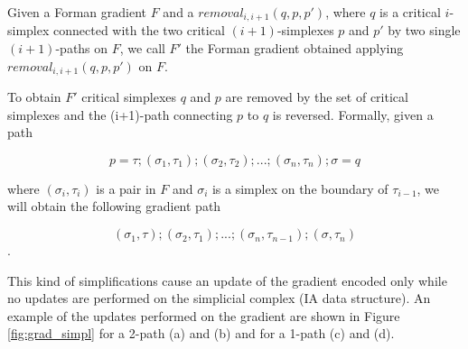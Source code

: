 \documentclass[preprint,5p,times,onecolumn]{article}
\begin{document}
Given a Forman gradient $F$ and a $removal_{i,i+1}(q,p,p')$, where $q$ is a critical $i$-simplex connected with the two critical $(i+1)$-simplexes $p$ and $p'$ by two single $(i+1)$-paths on $F$, we call $F'$ the Forman gradient obtained applying $removal_{i,i+1}(q,p,p')$ on $F$. 

To obtain $F'$ critical simplexes $q$ and $p$ are removed by the set of critical simplexes and the (i+1)-path connecting $p$ to $q$ is reversed. Formally, given a path

$$ p = \tau; (\sigma_1, \tau_1); (\sigma_2, \tau_2); ... ; (\sigma_n, \tau_n); \sigma = q $$

where $(\sigma_i, \tau_i)$ is a pair in $F$ and $\sigma_i$ is a simplex on the boundary of $\tau_{i-1}$, we will obtain the following gradient path

$$(\sigma_1, \tau); (\sigma_2, \tau_1); ... ;  (\sigma_n, \tau_{n-1}); (\sigma, \tau_n)  $$.

This kind of simplifications cause an update of the gradient encoded only while no updates are performed on the simplicial complex (IA data structure). An example of the updates performed on the gradient are shown in Figure \ref{fig:grad_simpl} for a 2-path (a) and (b) and for a 1-path (c) and (d).
\end{document}
